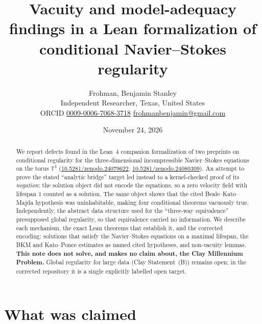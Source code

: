 \documentclass[11pt]{article}
\title{Vacuity and model-adequacy findings in a Lean formalization of conditional
Navier--Stokes regularity}
\author{Frohman, Benjamin Stanley\\
\small Independent Researcher, Texas, United States\\
\small ORCID \href{https://orcid.org/0009-0006-7068-3718}{0009-0006-7068-3718}\quad
\href{mailto:frohmanbenjamin@gmail.com}{frohmanbenjamin@gmail.com}}
\date{November 24, 2026}
\theoremstyle{definition}
\newcommand{\T}{\mathbb{T}^3}
\begin{document}
\maketitle
{}\par\medskip


\begin{abstract}
We report defects found in the Lean~4 companion formalization of two preprints on
conditional regularity for the three-dimensional incompressible Navier--Stokes
equations on the torus $\T$
(\href{https://doi.org/10.5281/zenodo.24079622}{10.5281/zenodo.24079622},
\href{https://doi.org/10.5281/zenodo.24080309}{10.5281/zenodo.24080309}).
An attempt to prove the stated ``analytic bridge'' target led instead to a
kernel-checked proof of its \emph{negation}: the solution object did not encode the
equations, so a zero velocity field with lifespan $1$ counted as a solution. The same
object shows that the cited Beale--Kato--Majda hypothesis was uninhabitable, making four
conditional theorems vacuously true. Independently, the abstract data structure used for
the ``three-way equivalence'' presupposed global regularity, so that equivalence carried
no information. We describe each mechanism, the exact Lean theorems that establish it,
and the corrected encoding: solutions that satisfy the Navier--Stokes equations on a
maximal lifespan, the BKM and Kato--Ponce estimates as named cited hypotheses, and
non-vacuity lemmas. \textbf{This note does not solve, and makes no claim about, the Clay
Millennium Problem.} Global regularity for large data (Clay Statement~(B)) remains open;
in the corrected repository it is a single explicitly labelled open target.
\end{abstract}

\section{What was claimed}
\end{document}
